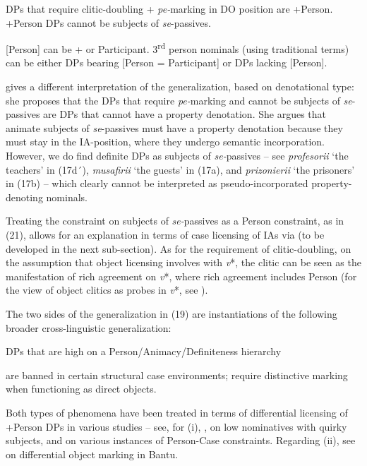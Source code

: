 \documentclass[output=paper]{langsci/langscibook}
\begin{document}
\ea%
    \label{ex:giurgea:21}
    \ea DPs that require clitic-doubling + \textit{pe-}marking in DO position are +Person.
      \ex +Person DPs cannot be subjects of \textit{se}{}-passives.
    \z
\z

\hspace*{-0.35895pt}[Person] can be + or \textminus{}Participant. 3\textsuperscript{rd} person nominals (using traditional terms) can be either DPs bearing [Person = \textminus{}Participant] or DPs lacking [Person].

\citet{Cornilescu1998} gives a different interpretation of the generalization, based on denotational type: she proposes that the DPs that require \textit{pe-}marking and cannot be subjects of \textit{se}{}-passives are DPs that cannot have a property denotation. She argues that animate subjects of \textit{se}{}-passives must have a property denotation because they must stay in the IA-position, where they undergo semantic incorporation. However, we do find definite DPs as subjects of \textit{se-}passives – see \textit{profesorii} ‘the teachers’ in (17d´), \textit{musafirii} ‘the guests’ in (17a), and \textit{prizonierii} ‘the prisoners’ in (17b) – which clearly cannot be interpreted as pseudo-incorporated property-denoting nominals.

Treating the constraint on subjects of \textit{se-}passives as a Person constraint, as in (21), allows for an explanation in terms of case licensing of IAs via  (to be developed in the next sub-section). As for the requirement of clitic-doubling, on the assumption that object licensing involves  with \textit{v}*, the clitic can be seen as the manifestation of rich agreement on \textit{v}*, where rich agreement includes Person (for the view of  object clitics as probes in \textit{v}*, see \citealt{Roberts2010}).

The two sides of the generalization in (19) are instantiations of the following broader cross-linguistic generalization:

\ea%
    DPs that are high on a Person\slash Animacy/Definiteness hierarchy\label{ex:giurgea:22}\\
        \begin{xlisti}
        \ex are banned in certain structural case environments;
        \ex require distinctive marking when functioning as direct objects.
        \end{xlisti}
\z

Both types of phenomena have been treated in terms of differential licensing of +Person DPs in various studies – see, for (i), \citet{Sigurðsson2004,Sigurðsson2011,Sigurðsson2012,Sigurðsson2008}, on  low nominatives with quirky subjects, and \citet{Rezac2011} on various instances of Person-Case constraints. Regarding (ii), see \citet{VanderWal2015} on differential object marking in Bantu.
\end{document}
